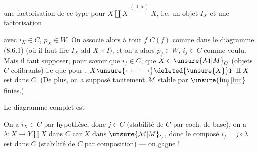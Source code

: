  une  factorisation de ce type pour $X\amalg X\xrightarrow{(\mathrm{id},\mathrm{id})}X$, i.e. un objet $I_X$ et une  factorisation


avec $i_X\in C$, $p_X\in W$. On  associe alors à tout $f$   $C(f)$ comme dans le diagramme (8.6.1) (où il faut lire $I_X$ ald $X\times I$), et on a alors $p_f\in W$, $i_f\in C$ comme voulu. Mais il faut supposer, pour savoir que $i_f\in C$, que  $X\in \unsure{\mathcal{M}|M}_C$ (objets $C$-cofibrants) i.e que pour , $X\unsure{\rightarrowtail|\longrightarrow}\deleted{\unsure{X}}Y\amalg X$ est dans $C$. (De plus, on a supposé tacitement $\mathcal{M}$ stable par $\unsure{\varinjlim|\underline{\lim}}$ finies.)

Le diagramme complet est

\diagram{\[
\left\{\begin{gathered}
\begin{tikzcd}[ampersand replacement=\&,column sep=large,row sep=large]
\& X\arrow[r,"f"]\arrow[d,"{\mathrm{inj}_0^X}"]\arrow[dr,phantom,"{\scriptstyle\mathrm{cocart}}" description] \& Y\arrow[d]\\
X\arrow[r,"{\mathrm{inj}_1^X}"]\arrow[dr,dashed,"{\delta_1^X}"'] \& X\amalg X\arrow[d,"{i_X}"]\arrow[r,"{f''}"]\arrow[dr,phantom,"{\scriptstyle\mathrm{cocart}}" description] \& Y\amalg X\arrow[d,"{\unsure{j|J}}"]\\
\& I_X\arrow[uu,bend right=20,dashed,"{p_X}"']\arrow[r,"{f'}"'] \& Z(f)\arrow[uu,bend right=38,dashed,"{p_f}"']
\end{tikzcd}\\
f=p_f i_f\ ,\ \text{où }\ i_f=f'\circ\delta_1^X=j\circ(\underbrace{f''\circ\mathrm{inj}_1^X}_{\lambda}) .
\end{gathered}\right.
\tag*{(8.\unsure{7}.1)}
\]}

On a $i_X\in C$ par hypothèse, donc $j\in C$ (stabilité de $C$ par coch. de base), on a $\lambda:X\longrightarrow Y\amalg X$ dans $C$ car $X$ dans $\unsure{\mathcal{M}|M}_C$, donc le composé $i_f=j\circ\lambda$ est dans $C$ (stabilité de $C$ par composition) --- on gagne !

